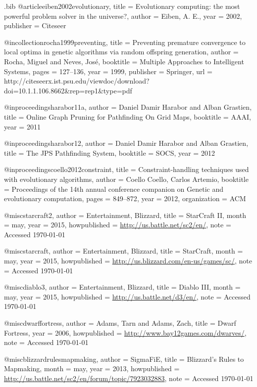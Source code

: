 \begin{filecontents*}{\jobname.bib}
@article{eiben2002evolutionary,
	title		= {{E}volutionary {c}omputing: {t}he {m}ost {p}owerful {p}roblem {s}olver in the {u}niverse?},
	author	= {Eiben, A. E.},
	year		= {2002},
	publisher	= {Citeseer}
}

@incollection{rocha1999preventing,
	title		= {{P}reventing {p}remature {c}onvergence to {l}ocal {o}ptima in {g}enetic {a}lgorithms via {r}andom {o}ffspring {g}eneration},
	author	= {Rocha, Miguel and Neves, Jos{\'e}},
	booktitle	= {Multiple Approaches to Intelligent Systems},
	pages		= {127--136},
	year		= {1999},
	publisher	= {Springer},
	url 		= {http://citeseerx.ist.psu.edu/viewdoc/download?doi=10.1.1.106.8662&rep=rep1&type=pdf}
}

@inproceedings{harabor11a,
	author	= {Daniel Damir Harabor and Alban Grastien},
	title     	= {{O}nline {G}raph {P}runing for {P}athfinding {O}n {G}rid {M}aps},
	booktitle 	= {AAAI},
	year      	= {2011}
}

@inproceedings{harabor12,
	author    	= {Daniel Damir Harabor and Alban Grastien},
	title     	= {{T}he {J}{P}{S} {P}athfinding {S}ystem},
	booktitle 	= {SOCS},
	year      	= {2012}
}

@inproceedings{coello2012constraint,
	title		= {{C}onstraint-{h}andling {t}echniques used with {e}volutionary {a}lgorithms},
	author	= {Coello Coello, Carlos Artemio},
	booktitle	= {Proceedings of the 14th annual conference companion on Genetic and evolutionary computation},
	pages		= {849--872},
	year		= {2012},
	organization	= {ACM}
}

@misc{starcraft2,
	author 	= {Entertainment, Blizzard},
	title 		= {StarCraft II},
	month 	= may,
	year 		= {2015},
	howpublished = {\url{http://us.battle.net/sc2/en/}},
	note  		= {Accessed \today}
}

@misc{starcraft,
	author 	= {Entertainment, Blizzard},
	title 		= {StarCraft},
	month 	= may,
	year 		= {2015},
	howpublished = {\url{http://us.blizzard.com/en-us/games/sc/}},
	note  		= {Accessed \today}
}

@misc{diablo3,
	author 	= {Entertainment, Blizzard},
	title 		= {Diablo III},
	month 	= may,
	year 		= {2015},
	howpublished = {\url{http://us.battle.net/d3/en/}},
	note  		= {Accessed \today}
}

@misc{dwarffortress,
	author 	= {Adams, Tarn and Adams, Zach},
	title 		= {{D}warf {F}ortress},
	year 		= {2006}, 
	howpublished = {\url{http://www.bay12games.com/dwarves/}},
	note		= {Accessed \today}
}

@misc{blizzardrulesmapmaking,
	author 	= {SigmaFiE},
	title 		= {Blizzard's Rules to Mapmaking},
	month	= may,
	year 		= {2013},
	howpublished = {\url{http://us.battle.net/sc2/en/forum/topic/7923032883}},
	note  		= {Accessed \today}
}


\end{filecontents*}
